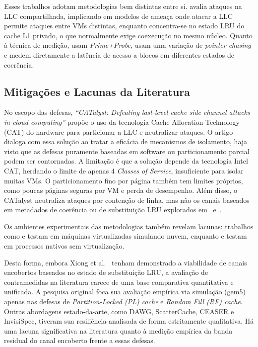 Esses trabalhos adotam metodologias bem distintas entre si. \cite{7163050} avalia ataques na LLC compartilhada, implicando em modelos de ameaça onde atacar a LLC permite ataques entre VMs distintas, enquanto \cite{9065598} concentra-se no estado LRU do cache L1 privado, o que normalmente exige coexecução no mesmo núcleo. Quanto à técnica de medição, \cite{7163050} usam \textit{Prime+Probe}, \cite{9065598} usam uma variação de \textit{pointer chasing} e \cite{8327007} medem diretamente a latência de acesso a blocos em diferentes estados de coerência.

\subsection{Mitigações e Lacunas da Literatura}

No escopo das defesas, \textit{“CATalyst: Defeating last-level cache side channel attacks in cloud computing”}\cite{7446082} propõe o uso da tecnologia Cache Allocation Technology (CAT) do hardware para particionar a LLC e neutralizar ataques. O artigo dialoga com essa solução ao tratar a eficácia de mecanismos de isolamento, haja visto que as defesas puramente baseadas em software ou particionamento parcial podem ser contornadas. A limitação é que a solução depende da tecnologia Intel CAT, herdando o limite de apenas 4 \textit{Classes of Service}, insuficiente para isolar muitas VMs. O particionamento fino por página também tem limites próprios, como poucas páginas seguras por VM e perda de desempenho. Além disso, o CATalyst neutraliza ataques por contenção de linha, mas não os canais baseados em metadados de coerência ou de substituição LRU explorados em~\cite{8327007} e~\cite{9065598}.

Os ambientes experimentais das metodologias também revelam lacunas: trabalhos como \cite{7163050} e \cite{7446082} testam em máquinas virtualizadas simulando nuvem, enquanto \cite{8327007} e \cite{9065598} testam em processos nativos sem virtualização. 

Desta forma, embora Xiong et al.~\cite{9354935} tenham demonstrado a viabilidade de canais encobertos baseados no estado de substituição LRU, a avaliação de contramedidas na literatura carece de uma base comparativa quantitativa e unificada. A pesquisa original foca sua avaliação empírica via simulação (gem5) apenas nas defesas de \textit{Partition-Locked (PL) cache} e \textit{Random Fill (RF) cache}. Outras abordagens estado-da-arte, como DAWG, ScatterCache, CEASER e InvisiSpec, tiveram sua resiliência analisada de forma estritamente qualitativa. Há uma lacuna significativa na literatura quanto à medição empírica da banda residual do canal encoberto frente a essas defesas.


